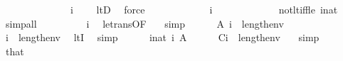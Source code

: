 \begin{isabellebody}
\ \ \ \ \isamarkupfalse%
\ \isanewline
\ \ \ \ \isamarkupfalse%
\ {}{\isacharcolon}{\kern0pt}\ {\isachardoublequoteopen}{\isasymnot}\ i\ {\isacharless}{\kern0pt}\ {}{\isachardoublequoteclose}\ \isamarkupfalse%
\ ltD\ \isamarkupfalse%
\ force\isanewline
\ \ \ \ \isamarkupfalse%
\isanewline
\ \ \ \ \isamarkupfalse%
\ {\isachardoublequoteopen}{}\ {\isasymle}\ i{\isachardoublequoteclose}\ {\isachardoublequoteopen}{}\ {\isasymle}\ {}{\isachardoublequoteclose}\ \isanewline
\ \ \ \ \ \ \isamarkupfalse%
\ \ not{\isacharunderscore}{\kern0pt}lt{\isacharunderscore}{\kern0pt}iff{\isacharunderscore}{\kern0pt}le\ {\isacartoucheopen}i{\isasymin}nat{\isacartoucheclose}\ \isamarkupfalse%
\ simp{\isacharunderscore}{\kern0pt}all\isanewline
\ \ \ \ \isamarkupfalse%
\ \isamarkupfalse%
\ {\isachardoublequoteopen}{}\ {\isasymle}\ i{\isachardoublequoteclose}\ \isamarkupfalse%
\ le{\isacharunderscore}{\kern0pt}trans{\isacharbrackleft}{\kern0pt}OF\ {\isacartoucheopen}{}{\isasymle}{}{\isacartoucheclose}{\isacharbrackright}{\kern0pt}\ \isamarkupfalse%
\ simp\isanewline
\ \ \ \ \isamarkupfalse%
\ A\ {\isacartoucheopen}i\ {\isasymin}\ {}{\isacharhash}{\kern0pt}{\isacharplus}{\kern0pt}length{\isacharparenleft}{\kern0pt}env{\isacharparenright}{\kern0pt}{\isacartoucheclose}\ \isanewline
\ \ \ \ \isamarkupfalse%
\ {\isachardoublequoteopen}i\ {\isacharless}{\kern0pt}\ {}{\isacharhash}{\kern0pt}{\isacharplus}{\kern0pt}length{\isacharparenleft}{\kern0pt}env{\isacharparenright}{\kern0pt}{\isachardoublequoteclose}\ \isamarkupfalse%
\ ltI\ \isamarkupfalse%
\ simp\isanewline
\ \ \ \ \isamarkupfalse%
\ {\isacartoucheopen}i{\isasymin}nat{\isacartoucheclose}\ {\isacartoucheopen}{}{\isasymle}i{\isacartoucheclose}\ A\isanewline
\ \ \ \ \isamarkupfalse%
\ C{\isacharcolon}{\kern0pt}{\isachardoublequoteopen}i{\isacharhash}{\kern0pt}{\isacharplus}{\kern0pt}{}\ {\isacharless}{\kern0pt}\ {}{\isacharhash}{\kern0pt}{\isacharplus}{\kern0pt}length{\isacharparenleft}{\kern0pt}env{\isacharparenright}{\kern0pt}{\isachardoublequoteclose}\ \ \isamarkupfalse%
\ simp\isanewline
\ \ \ \ \isamarkupfalse%
\ that\ \isanewline
\ \ \ \ \isamarkupfalse%

\end{isabellebody}
